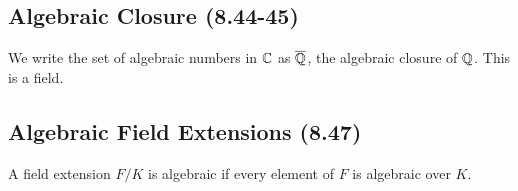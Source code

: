 \subsection{Algebraic Closure (8.44-45)} \label{8.44} \label{8.45}

We write the set of algebraic numbers in $\mathbb{C}$ as $\overline{\mathbb{Q}}$, the algebraic closure
of $\mathbb{Q}$. This is a field.

\subsection{Algebraic Field Extensions (8.47)} \label{8.47}

A field extension $F / K$ is algebraic if every element of $F$ is algebraic over $K$.

